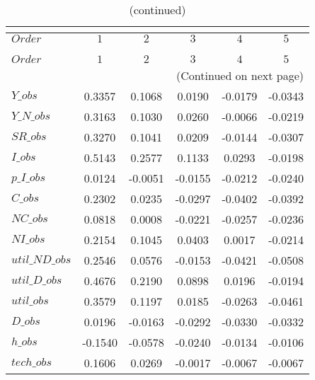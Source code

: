  
\begin{center}
\begin{longtable}{lccccc} 
\caption{COEFFICIENTS OF AUTOCORRELATION}\\
 \label{Table:th_autocorr_matrix}\\
\toprule 
$Order          $	 & 	 $          1$	 & 	 $          2$	 & 	 $          3$	 & 	 $          4$	 & 	 $          5$\\
\midrule \endfirsthead 
\caption{(continued)}\\
 \toprule \\ 
$Order          $	 & 	 $          1$	 & 	 $          2$	 & 	 $          3$	 & 	 $          4$	 & 	 $          5$\\
\midrule \endhead 
\midrule \multicolumn{6}{r}{(Continued on next page)} \\ \bottomrule \endfoot 
\bottomrule \endlastfoot 
$Y\_obs         $	 & 	     0.3357	 & 	     0.1068	 & 	     0.0190	 & 	    -0.0179	 & 	    -0.0343 \\ 
$Y\_N\_obs      $	 & 	     0.3163	 & 	     0.1030	 & 	     0.0260	 & 	    -0.0066	 & 	    -0.0219 \\ 
$SR\_obs        $	 & 	     0.3270	 & 	     0.1041	 & 	     0.0209	 & 	    -0.0144	 & 	    -0.0307 \\ 
$I\_obs         $	 & 	     0.5143	 & 	     0.2577	 & 	     0.1133	 & 	     0.0293	 & 	    -0.0198 \\ 
$p\_I\_obs      $	 & 	     0.0124	 & 	    -0.0051	 & 	    -0.0155	 & 	    -0.0212	 & 	    -0.0240 \\ 
$C\_obs         $	 & 	     0.2302	 & 	     0.0235	 & 	    -0.0297	 & 	    -0.0402	 & 	    -0.0392 \\ 
$NC\_obs        $	 & 	     0.0818	 & 	     0.0008	 & 	    -0.0221	 & 	    -0.0257	 & 	    -0.0236 \\ 
$NI\_obs        $	 & 	     0.2154	 & 	     0.1045	 & 	     0.0403	 & 	     0.0017	 & 	    -0.0214 \\ 
$util\_ND\_obs  $	 & 	     0.2546	 & 	     0.0576	 & 	    -0.0153	 & 	    -0.0421	 & 	    -0.0508 \\ 
$util\_D\_obs   $	 & 	     0.4676	 & 	     0.2190	 & 	     0.0898	 & 	     0.0196	 & 	    -0.0194 \\ 
$util\_obs      $	 & 	     0.3579	 & 	     0.1197	 & 	     0.0185	 & 	    -0.0263	 & 	    -0.0461 \\ 
$D\_obs         $	 & 	     0.0196	 & 	    -0.0163	 & 	    -0.0292	 & 	    -0.0330	 & 	    -0.0332 \\ 
$h\_obs         $	 & 	    -0.1540	 & 	    -0.0578	 & 	    -0.0240	 & 	    -0.0134	 & 	    -0.0106 \\ 
$tech\_obs      $	 & 	     0.1606	 & 	     0.0269	 & 	    -0.0017	 & 	    -0.0067	 & 	    -0.0067 \\ 
\end{longtable}
 \end{center}
